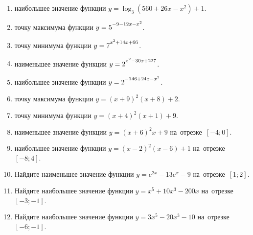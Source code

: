 \documentclass[a4paper,10pt]{article}
\begin{document}
\begin{enumerate}
\item {} наибольшее значение функции $y=\log_3\left(560+26x-x^2\right)+1$.

\item {} точку максимума функции $y=5\strut^{-9-12x-x^2}$.

\item {} точку минимума функции $y=7\strut^{x^2+14x+66}$.

\item {} наименьшее значение функции $y=2\strut^{x^2-30x+227}$.

\item {} наибольшее значение функции $y=2\strut^{-146+24x-x^2}$.

\item {} точку максимума функции $y=\left(x+9\right)^2\left(x+8\right)+2$.

\item {} точку минимума функции $y=\left(x+4\right)^2\left(x+1\right)+9$.

\item {} наименьшее значение функции $y=\left(x+6\right)^2x+9$ на~отрезке~$\left[-4;0\right]$.

\item {} наибольшее значение функции $y=\left(x-2\right)^2\left(x-6\right)+1$ на~отрезке~$\left[-8;4\right]$.

\item Найдите наименьшее значение функции $y=e^{2x}-13e^x-9$ на~отрезке~$\left[1;2\right]$.

\item Найдите наибольшее значение функции $y=x^5+10x^3-200x$ на~отрезке~$\left[-3;-1\right]$.

\item Найдите наибольшее значение функции $y=3x^5-20x^3-10$ на~отрезке~$\left[-6;-1\right]$.

\end{enumerate}
\end{document}
